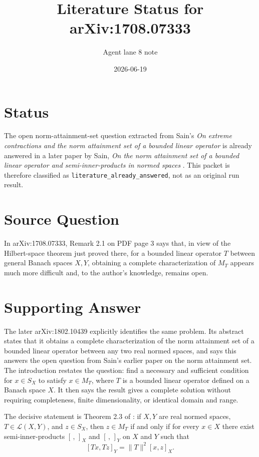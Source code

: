 \documentclass[11pt]{article}
\title{Literature Status for arXiv:1708.07333}
\author{Agent lane 8 note}
\date{2026-06-19}
\begin{document}
\maketitle

\section*{Status}

The open norm-attainment-set question extracted from Sain's
\emph{On extreme contractions and the norm attainment set of a bounded linear
operator} \cite{SainExtreme} is already answered in a later paper by Sain,
\emph{On the norm attainment set of a bounded linear operator and
semi-inner-products in normed spaces} \cite{SainSIP}.  This packet is therefore
classified as \texttt{literature\_already\_answered}, not as an original run
result.

\section*{Source Question}

In arXiv:1708.07333, Remark 2.1 on PDF page 3 says that, in view of the
Hilbert-space theorem just proved there, for a bounded linear operator
\(T\) between general Banach spaces \(X,Y\), obtaining a complete
characterization of \(M_T\) appears much more difficult and, to the author's
knowledge, remains open.

\section*{Supporting Answer}

The later arXiv:1802.10439 explicitly identifies the same problem.  Its
abstract states that it obtains a complete characterization of the norm
attainment set of a bounded linear operator between any two real normed
spaces, and says this answers the open question from Sain's earlier paper
on the norm attainment set.  The introduction restates the question:
find a necessary and sufficient condition for \(x\in S_X\) to satisfy
\(x\in M_T\), where \(T\) is a bounded linear operator defined on a Banach
space \(X\).  It then says the result gives a complete solution without
requiring completeness, finite dimensionality, or identical domain and range.

The decisive statement is Theorem 2.3 of \cite{SainSIP}: if \(X,Y\) are real
normed spaces, \(T\in\mathcal L(X,Y)\), and \(z\in S_X\), then \(z\in M_T\)
if and only if for every \(x\in X\) there exist semi-inner-products
\([\, ,\,]_X\) and \([\, ,\,]_Y\) on \(X\) and \(Y\) such that
\[
  [Tx,Tz]_Y=\|T\|^2 [x,z]_X.
\]
\end{document}
